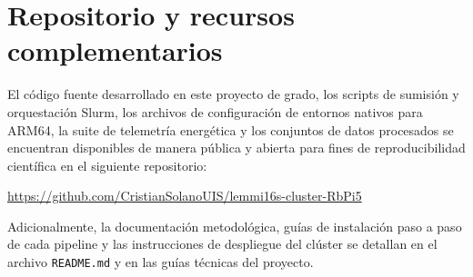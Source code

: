 \documentclass[12pt,oneside,spanish]{book}
\begin{document}
    
    
    
    
    \chapter*{Repositorio y recursos complementarios}
    
    \vspace{1cm}
    
    El código fuente desarrollado en este proyecto de grado, los scripts de sumisión y orquestación Slurm, los archivos de configuración de entornos nativos para ARM64, la suite de telemetría energética y los conjuntos de datos procesados se encuentran disponibles de manera pública y abierta para fines de reproducibilidad científica en el siguiente repositorio:
    
    \begin{center}
    \url{https://github.com/CristianSolanoUIS/lemmi16s-cluster-RbPi5}
    \end{center}
    
    Adicionalmente, la documentación metodológica, guías de instalación paso a paso de cada pipeline y las instrucciones de despliegue del clúster se detallan en el archivo \texttt{README.md} y en las guías técnicas del proyecto.
    
    
    
\end{document}
